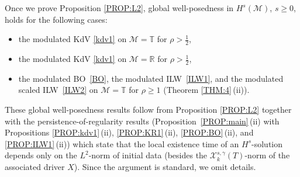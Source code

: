 \documentclass[letterpaper, 11pt,  reqno]{amsart}
\newcommand{\1}{\hspace{0.5mm}\text{I}\hspace{0.5mm}}
\newcommand{\noi}{\noindent}
\newcommand{\R}{\mathbb{R}}
\newcommand{\T}{\mathbb{T}}
\newcommand{\g}{\gamma}
\newcommand{\M}{\mathcal{M}}
\newcommand{\cX}{\mathcal{X}}
\numberwithin{equation}{section}
\numberwithin{theorem}{section}
\begin{document}
Once we prove 
 Proposition \ref{PROP:L2}, 
 global well-posedness in $H^s(\M)$, $s \ge 0$, 
holds
 for 
 the following cases:
 
  \smallskip
 \begin{itemize}
 \item[(i)]
 the modulated KdV \eqref{kdv1} on $\M = \T$
for   $\rho >  \frac 12$, 




 
 \smallskip
  \item[(ii)]
 the modulated KdV \eqref{kdv1} on $\M = \R$
for   $\rho >  \frac 12$, 



 \smallskip  
   \item[(iii)]
the modulated BO~\eqref{BO}, 
the modulated ILW~\eqref{ILW1}, 
and the modulated scaled ILW~\eqref{ILW2} on $\M = \T$
for  $\rho \ge 1 $
(Theorem \ref{THM:4}\,(ii)).


   
 
 \end{itemize}
 
  
  \noi
These global well-posedness results
follow from Proposition \ref{PROP:L2}
together with 
 the persistence-of-regularity results (Proposition~\ref{PROP:main}\,(ii)
with 
Propositions \ref{PROP:kdv1}\,(ii), 
 \ref{PROP:KR1}\,(ii), 
 \ref{PROP:BO}\,(ii), 
and  \ref{PROP:ILW1}\,(ii))
which state that the local existence
time of an $H^s$-solution depends
only on the $L^2$-norm of initial data
(besides the $\cX^{s, \g}_k(T)$-norm of the associated driver $X$).
Since the argument is standard, we omit details.
\end{document}
